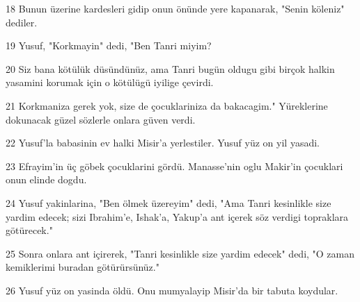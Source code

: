 \par 18 Bunun üzerine kardesleri gidip onun önünde yere kapanarak, "Senin köleniz" dediler.
\par 19 Yusuf, "Korkmayin" dedi, "Ben Tanri miyim?
\par 20 Siz bana kötülük düsündünüz, ama Tanri bugün oldugu gibi birçok halkin yasamini korumak için o kötülügü iyilige çevirdi.
\par 21 Korkmaniza gerek yok, size de çocuklariniza da bakacagim." Yüreklerine dokunacak güzel sözlerle onlara güven verdi.
\par 22 Yusuf'la babasinin ev halki Misir'a yerlestiler. Yusuf yüz on yil yasadi.
\par 23 Efrayim'in üç göbek çocuklarini gördü. Manasse'nin oglu Makir'in çocuklari onun elinde dogdu.
\par 24 Yusuf yakinlarina, "Ben ölmek üzereyim" dedi, "Ama Tanri kesinlikle size yardim edecek; sizi Ibrahim'e, Ishak'a, Yakup'a ant içerek söz verdigi topraklara götürecek."
\par 25 Sonra onlara ant içirerek, "Tanri kesinlikle size yardim edecek" dedi, "O zaman kemiklerimi buradan götürürsünüz."
\par 26 Yusuf yüz on yasinda öldü. Onu mumyalayip Misir'da bir tabuta koydular.



